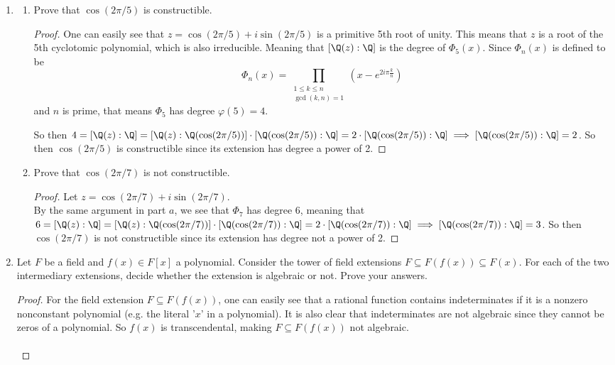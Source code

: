 \documentclass[12pt]{article}
\begin{document}
	\begin{enumerate}
		\item 
		\begin{enumerate}
			\item Prove that $\cos(2\pi/5)$ is constructible.
			\begin{proof}
				One can easily see that $z = \cos(2\pi/5) + i\sin(2\pi/5)$ is a primitive 5th root of unity. This means that $z$ is a root of the 5th cyclotomic polynomial, which is also irreducible. Meaning that $[\Q(z):\Q]$ is the degree of $\Phi_5(x)$. Since $\Phi_n(x)$ is defined to be
				\[\Phi_n(x) =  \prod_{\substack{1 \leq k \leq n \\ \gcd(k,n)=1}} (x - e^{2i\pi\frac{k}{n}})\]
				and $n$ is prime, that means $\Phi_5$ has degree $\varphi(5) = 4$.
				
				So then $4 = [\Q(z):\Q] = [\Q(z):\Q(\cos(2\pi/5))] \cdot [\Q(\cos(2\pi/5)):\Q] = 2 \cdot [\Q(\cos(2\pi/5)):\Q] \implies [\Q(\cos(2\pi/5)):\Q] = 2$. So then $\cos(2\pi/5)$ is constructible since its extension has degree a power of 2.
			\end{proof}
			\item Prove that $\cos(2\pi/7)$ is not constructible.
			\begin{proof}
				Let $z = \cos(2\pi/7) + i\sin(2\pi/7)$.\\
				By the same argument in part $a$, we see that $\Phi_7$ has degree $6$, meaning that $6 = [\Q(z):\Q] = [\Q(z):\Q(\cos(2\pi/7))] \cdot [\Q(\cos(2\pi/7)):\Q] = 2 \cdot [\Q(\cos(2\pi/7)):\Q] \implies [\Q(\cos(2\pi/7)):\Q] = 3$. So then $\cos(2\pi/7)$ is not constructible since its extension has degree not a power of 2.
			\end{proof}
		\end{enumerate}

		\item Let $F$ be a field and $f(x) \in F[x]$ a polynomial. Consider the tower of field extensions $F \subseteq F(f(x)) \subseteq F(x)$. For each of the two intermediary extensions, decide whether the extension is algebraic or not. Prove your answers.
		\begin{proof}
			For the field extension $F \subseteq F(f(x))$, one can easily see that a rational function contains indeterminates if it is a nonzero nonconstant polynomial (e.g. the literal '$x$' in a polynomial). It is also clear that indeterminates are not algebraic since they cannot be zeros of a polynomial. So $f(x)$ is transcendental, making $F \subseteq F(f(x))$ not algebraic.\\\\
			

\end{proof}
\end{enumerate}
\end{document}
